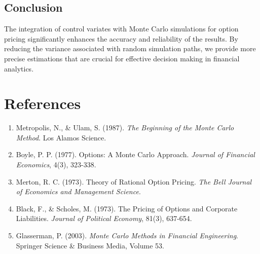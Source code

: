 \documentclass{article}
\begin{document}
\subsection*{Conclusion}
The integration of control variates with Monte Carlo simulations for option pricing significantly enhances the accuracy and reliability of the results. By reducing the variance associated with random simulation paths, we provide more precise estimations that are crucial for effective decision making in financial analytics.



\newpage
\section{References}
\begin{enumerate}
    \item Metropolis, N., \& Ulam, S. (1987). \textit{The Beginning of the Monte Carlo Method}. Los Alamos Science.
    \item Boyle, P. P. (1977). Options: A Monte Carlo Approach. \textit{Journal of Financial Economics}, 4(3), 323-338.
    \item Merton, R. C. (1973). Theory of Rational Option Pricing. \textit{The Bell Journal of Economics and Management Science}.
    \item Black, F., \& Scholes, M. (1973). The Pricing of Options and Corporate Liabilities. \textit{Journal of Political Economy}, 81(3), 637-654.
    \item Glasserman, P. (2003). \textit{Monte Carlo Methods in Financial Engineering}. Springer Science \& Business Media, Volume 53.
\end{enumerate}
\end{document}
